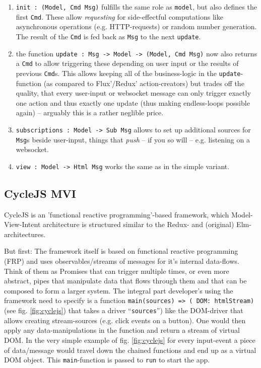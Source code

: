 \begin{enumerate}
    \item \texttt{init : (Model, Cmd Msg)} fulfills the same role as \texttt{model}, but also defines the first \texttt{Cmd}. These allow \textit{requesting} for side-effectful computations like asynchronous operations (e.g. HTTP-requests) or random number generation. The result of the \texttt{Cmd} is fed back as \texttt{Msg} to the next \texttt{update}.
    \item the function \texttt{update : Msg -> Model -> (Model, Cmd Msg)} now also returns a \texttt{Cmd} to allow triggering these depending on user input or the results of previous \texttt{Cmd}s. This allows keeping all of the business-logic in the \texttt{update}-function (as compared to Flux'/Redux' action-creators) but trades off the quality, that every user-input or websocket message can only trigger exactly one action and thus exactly one update (thus making endless-loops
        possible again) -- arguably this is a rather neglible price.
    \item \texttt{subscriptions : Model -> Sub Msg} allows to set up additional sources for \texttt{Msg}s beside user-input, things that \textit{push} -- if you so will --
        e.g. listening on a websocket.
    \item \texttt{view : Model -> Html Msg} works the same as in the simple variant.
\end{enumerate}

\subsection{CycleJS MVI}

CycleJS is an 'functional reactive programming'-based framework, which Model-View-Intent architecture is structured similar to the Redux- and (original) Elm-architectures. 

But first: The framework itself is based on functional reactive programming (FRP) and uses observables/streams of messages for it's internal data-flows. Think of them as Promises that can trigger multiple times, or even more abstract, pipes that manipulate data that flows through them and that can be composed to form a larger system. The integral part developer's using the framework need to specify is a function \texttt{main(sources) => ({ DOM: htmlStream})} (see fig. \ref{fig:cyclejs}) that takes a driver ``\texttt{sources}'') like the DOM-driver that allows creating stream-sources (e.g. click events on a button). One would then apply any data-manipulations in the function and return a stream of virtual DOM. In the very simple example of fig. \ref{fig:cyclejs} for every input-event a piece of data/message would travel down the chained functions and end up as a virtual DOM object. This \texttt{main}-function is passed to \texttt{run} to start the app.

